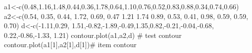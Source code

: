 \begin{Examples}
\begin{ExampleCode}
a1<-c(0.48,1.16,1.48,0.44,0.36,1.78,0.64,1.10,0.76,0.52,0.83,0.88,0.34,0.74,0.66)
a2<-c(0.54, 0.35, 0.44, 1.72, 0.69, 0.47 1.21 1.74 0.89, 0.53, 0.41, 0.98, 0.59, 0.59, 0.70)
d<-c(-1.11,0.29, 1.51,-0.82,-1.89,-0.49,1.35,0.82,-0.21,-0.04,-0.68, 0.22,-0.86,-1.33, 1.21)
contour.plot(a1,a2,d) # test contour
contour.plot(a1[1],a2[1],d[1])# item contour
\end{ExampleCode}
\end{Examples}

